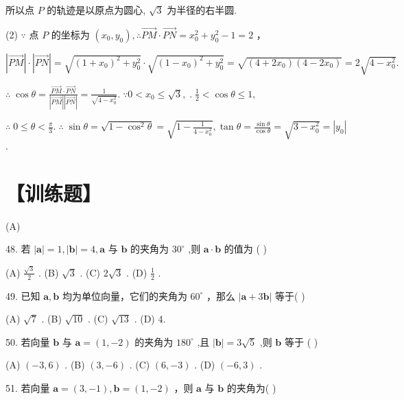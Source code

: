 \documentclass[10pt]{article}
\begin{document}
所以点 \(P\) 的轨迹是以原点为圆心, \(\sqrt{3}\) 为半径的右半圆.

(2) \(\because\) 点 \(P\) 的坐标为 \(\left( {{x}_{0},{y}_{0}}\right) ,\therefore \overrightarrow{PM} \cdot  \overrightarrow{PN} = {x}_{0}^{2} + {y}_{0}^{2} - 1 = 2\) ，

\(\left| \overrightarrow{PM}\right|  \cdot  \left| \overrightarrow{PN}\right|  = \sqrt{{\left( 1 + {x}_{0}\right) }^{2} + {y}_{0}^{2}} \cdot  \sqrt{{\left( 1 - {x}_{0}\right) }^{2} + {y}_{0}^{2}} = \sqrt{\left( {4 + 2{x}_{0}}\right) \left( {4 - 2{x}_{0}}\right) } = 2\sqrt{4 - {x}_{0}^{2}}.\)

\(\therefore \;\cos \theta  = \frac{\overrightarrow{PM} \cdot  \overrightarrow{PN}}{\left| \overrightarrow{PM}\right| \left| \overrightarrow{PN}\right| } = \frac{1}{\sqrt{4 - {x}_{0}^{2}}}.\;\because 0 < {x}_{0} \leq  \sqrt{3},\;.\;\frac{1}{2} < \cos \theta  \leq  1,\)

\(\therefore \;0 \leq  \theta  < \frac{\pi }{3}.\;\therefore \;\sin \theta  = \sqrt{1 - {\cos }^{2}\theta } = \sqrt{1 - \frac{1}{4 - {x}_{0}^{2}}},\tan \theta  = \frac{\sin \theta }{\cos \theta } = \sqrt{3 - {x}_{0}^{2}} = \left| {y}_{0}\right|\) .

\section*{【训练题】}

(A)

48. 若 \(\left| \mathbf{a}\right|  = 1,\left| \mathbf{b}\right|  = 4,\mathbf{a}\) 与 \(\mathbf{b}\) 的夹角为 \({30}^{ \circ  }\) ,则 \(\mathbf{a} \cdot  \mathbf{b}\) 的值为 ( )

(A) \(\frac{\sqrt{3}}{2}\) . (B) \(\sqrt{3}\) . (C) \(2\sqrt{3}\) . (D) \(\frac{1}{2}\) .

49. 已知 \(\mathbf{a},\mathbf{b}\) 均为单位向量，它们的夹角为 \({60}^{ \circ  }\) ，那么 \(\left| {\mathbf{a} + 3\mathbf{b}}\right|\) 等于( )

(A) \(\sqrt{7}\) . (B) \(\sqrt{10}\) . (C) \(\sqrt{13}\) . (D) 4.

50. 若向量 \(\mathbf{b}\) 与 \(\mathbf{a} = \left( {1, - 2}\right)\) 的夹角为 \({180}^{ \circ  }\) ,且 \(\left| \mathbf{b}\right|  = 3\sqrt{5}\) ,则 \(\mathbf{b}\) 等于 ( )

(A) \(\left( {-3,6}\right)\) . (B) \(\left( {3, - 6}\right)\) . (C) \(\left( {6, - 3}\right)\) . (D) \(\left( {-6,3}\right)\) .

51. 若向量 \(\mathbf{a} = \left( {3, - 1}\right) ,\mathbf{b} = \left( {1, - 2}\right)\) ，则 \(\mathbf{a}\) 与 \(\mathbf{b}\) 的夹角为( )
\end{document}
